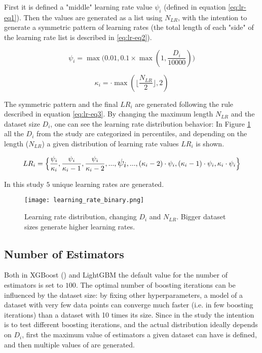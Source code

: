 First it is defined a "middle" learning rate value $\psi_i$ (defined in equation \ref{eq:lr-eq1}). Then the values are generated as a list using $N_{LR}$, with the intention to generate a symmetric pattern of learning rates (the total length of each "side" of the learning rate list is described in \ref{eq:lr-eq2}).

\begin{equation}
    \psi_i = \max\Big(0.01, 0.1 \times \max(1, \frac{D_i}{10000})\Big)
    \label{eq:lr-eq1}
\end{equation}

\begin{equation}
    \kappa_i = \cdot \max\left(\lfloor\frac{N_{LR}}{2}\rfloor, 2\right)
    \label{eq:lr-eq2}
\end{equation}

The symmetric pattern and the final $LR_i$ are generated following the rule described in equation \ref{eq:lr-eq3}. By changing the maximum length $N_{LR}$ and the dataset size $D_i$, one can see the learning rate distribution behavior: In Figure \ref{fig:hyperparam-lr1} all the $D_i$ from the study are categorized in percentiles, and depending on the length ($N_{LR}$) a given distribution of learning rate values $LR_i$ is shown.

\begin{equation}
    LR_i = \Big\{\frac{\psi_i}{\kappa_i}, \frac{\psi_i}{\kappa_i - 1}, \frac{\psi_i}{\kappa_i - 2}, ..., \text{\Large $\psi_i$}, ..., (\kappa_i - 2)\cdot\psi_i, (\kappa_i - 1)\cdot\psi_i, \kappa_i\cdot\psi_i\Big\}
    \label{eq:lr-eq3}
\end{equation}

In this study $5$ unique learning rates are generated.

\begin{figure}[!h]
    \centering
    \texttt{[image: learning\_rate\_binary.png]} 
    \caption{Learning rate distribution, changing $D_i$ and $N_{LR}$. Bigger dataset sizes generate higher learning rates.}
    \label{fig:hyperparam-lr1}
\end{figure}

\subsection{Number of Estimators}

Both in XGBoost () and LightGBM the default value for the number of estimators is set to $100$. The optimal number of boosting iterations can be influenced by the dataset size: by fixing other hyperparameters, a model of a dataset with very few data points can converge much faster (i.e. in few boosting iterations) than a dataset with 10 times its size. Since in the study the intention is to test different boosting iterations, and the actual distribution ideally depends on $D_i$, first the maximum value of estimators a given dataset can have is defined, and then  multiple values of  are generated. 

